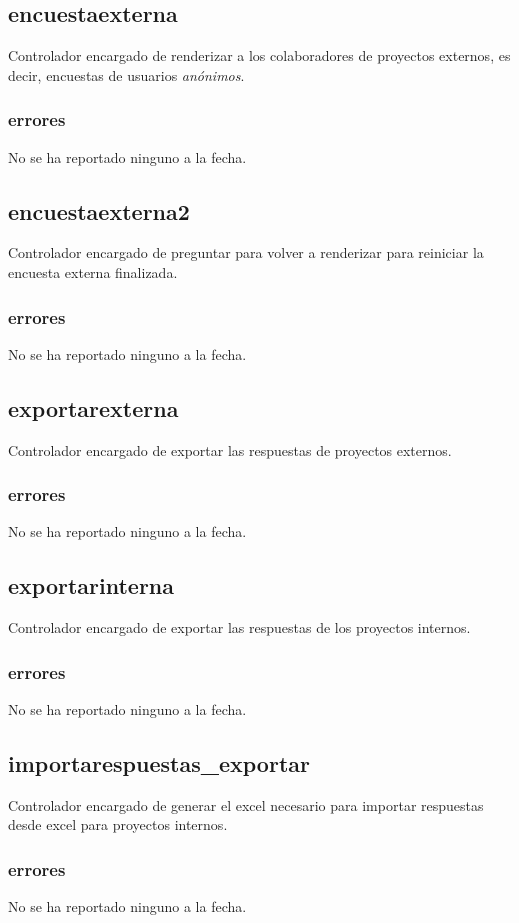 \documentclass[10pt,a4paper]{book}
\begin{document}
	\subsection{encuestaexterna}
	Controlador encargado de renderizar a los colaboradores de proyectos externos, es decir, encuestas de usuarios \textit{anónimos}.
	\subsubsection{errores}
	No se ha reportado ninguno a la fecha.
	
	\subsection{encuestaexterna2}
	Controlador encargado de preguntar para volver a renderizar para reiniciar la encuesta externa finalizada.
	\subsubsection{errores}
	No se ha reportado ninguno a la fecha.
	
	\subsection{exportarexterna}
	Controlador encargado de exportar las respuestas de proyectos externos.
	\subsubsection{errores}
	No se ha reportado ninguno a la fecha.
	
	\subsection{exportarinterna}
	Controlador encargado de exportar las respuestas de los proyectos internos.
	\subsubsection{errores}
	No se ha reportado ninguno a la fecha.
	
	\subsection{importarespuestas\_exportar}
	Controlador encargado de generar el excel necesario para importar respuestas desde excel para proyectos internos.
	\subsubsection{errores}
	No se ha reportado ninguno a la fecha. 
	
\end{document}
